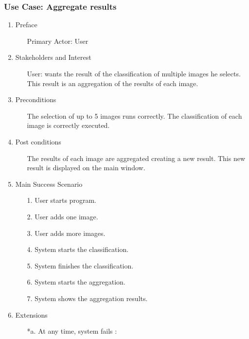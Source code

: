 \documentclass[parskip=full]{scrartcl}
\begin{document}
\pagebreak



\subsubsection {Use Case: Aggregate results }

\begin{enumerate}
	\item Preface
	\begin{itemize} [nosep]
		\item[] Primary Actor: User
	\end{itemize}
	\item Stakeholders and Interest
	\begin{itemize} [nosep]
		\item[] User: wants the result of the classification of multiple images he selects. This result is an aggregation of the results of each image.
	\end{itemize}
	\item Preconditions
	\begin{itemize} [nosep]
		\item[] The selection of up to 5 images runs correctly. The classification of each image is correctly executed.
	\end{itemize}
	\item Post conditions
	\begin{itemize} [nosep]
		\item[] The results of each image are aggregated creating a new result. This new result is displayed on the main window.
	\end{itemize}
	\item Main Success Scenario
	\begin{itemize} [nosep]
		\item[1.] User starts program.
		\item[2.] User adds one image.
		\item[3.] User adds more images.
		\item[4.] System starts the classification.
		\item[5.] System finishes the classification.
		\item[6.] System starts the aggregation.
		\item[7.] System shows the aggregation results.
	\end{itemize}
	\item Extensions
	\begin{itemize} [nosep]
		\item[*a.] At any time, system fails :

\end{itemize}
\end{enumerate}
\end{document}
